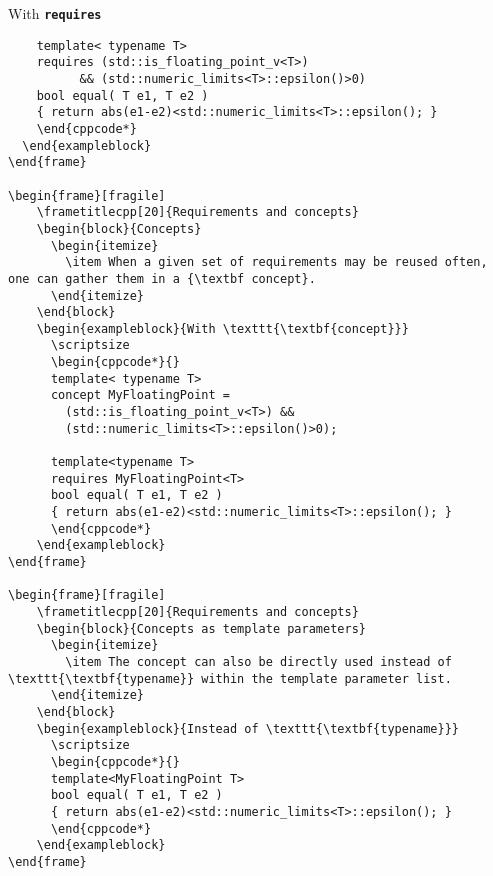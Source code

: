\begin{frame}[fragile]
\begin{exampleblock}{With \texttt{\textbf{requires}}}
\begin{verbatim}
    template< typename T>
    requires (std::is_floating_point_v<T>)
          && (std::numeric_limits<T>::epsilon()>0)
    bool equal( T e1, T e2 )
    { return abs(e1-e2)<std::numeric_limits<T>::epsilon(); }
    \end{cppcode*}
  \end{exampleblock}
\end{frame}

\begin{frame}[fragile]
    \frametitlecpp[20]{Requirements and concepts}
    \begin{block}{Concepts}
      \begin{itemize}
        \item When a given set of requirements may be reused often, one can gather them in a {\textbf concept}.
      \end{itemize}
    \end{block}
    \begin{exampleblock}{With \texttt{\textbf{concept}}}
      \scriptsize
      \begin{cppcode*}{}
      template< typename T>
      concept MyFloatingPoint =
        (std::is_floating_point_v<T>) &&
        (std::numeric_limits<T>::epsilon()>0);

      template<typename T>
      requires MyFloatingPoint<T>
      bool equal( T e1, T e2 )
      { return abs(e1-e2)<std::numeric_limits<T>::epsilon(); }
      \end{cppcode*}
    \end{exampleblock}
\end{frame}

\begin{frame}[fragile]
    \frametitlecpp[20]{Requirements and concepts}
    \begin{block}{Concepts as template parameters}
      \begin{itemize}
        \item The concept can also be directly used instead of \texttt{\textbf{typename}} within the template parameter list.
      \end{itemize}
    \end{block}
    \begin{exampleblock}{Instead of \texttt{\textbf{typename}}}
      \scriptsize
      \begin{cppcode*}{}
      template<MyFloatingPoint T>
      bool equal( T e1, T e2 )
      { return abs(e1-e2)<std::numeric_limits<T>::epsilon(); }
      \end{cppcode*}
    \end{exampleblock}
\end{frame}


\end{verbatim}
\end{exampleblock}
\end{frame}
